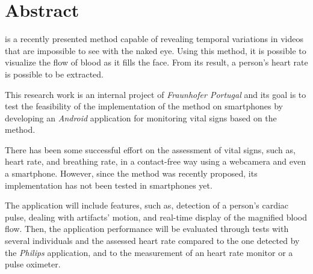 \chapter*{Abstract}

\evm{} is a recently presented method capable of revealing temporal
variations in videos that are impossible to see with the naked eye. 
Using this method, it is possible to visualize the flow of blood as 
it fills the face. From its result, a person's heart rate is possible
to be extracted.

This research work is an internal project of \emph{Fraunhofer Portugal}
and its goal is to test the feasibility of the 
implementation of the \evm{} method on smartphones by developing
an \emph{Android} application for monitoring vital signs based on 
the \evm{} method.

There has been some successful effort on the assessment of vital 
signs, such as, heart rate, and breathing rate, in a contact-free 
way using a webcamera and even a smartphone. However, since the
\evm{} method was recently proposed, its implementation has not 
been tested in smartphones yet.

The application will include features, such as, detection of a
person's cardiac pulse, dealing with artifacts' motion, and
real-time display of the magnified blood flow. Then, the application
performance will be evaluated through tests
with several individuals and the assessed heart rate compared to
the one detected by the \emph{Philips} application, 
and to the measurement of an heart rate monitor or a pulse oximeter.






